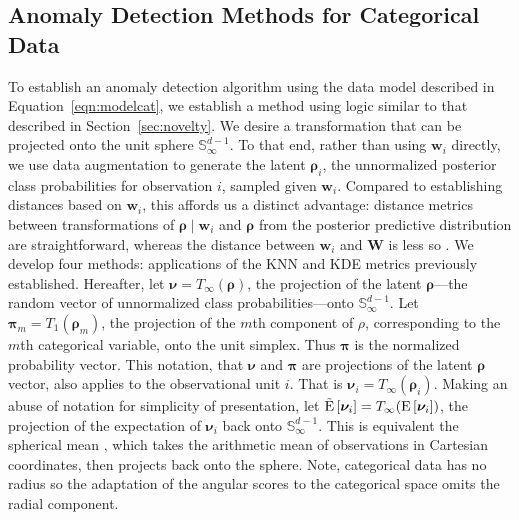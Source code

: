 \subsection{Anomaly Detection Methods for Categorical Data\label{subsec:catscores}}
To establish an anomaly detection algorithm using the data model described in 
  Equation~\ref{eqn:modelcat}, we establish a method using logic similar to that
  described in Section~\ref{sec:novelty}.  We desire a transformation that can be
  projected onto the unit sphere $\mathbb{S}_{\infty}^{d-1}$.  To that end, rather
  than using $\bm{w}_i$ directly, we use data augmentation to generate the latent 
  $\bm{\rho}_i$, the unnormalized posterior class probabilities for observation $i$, 
  sampled given $\bm{w}_i$.  Compared to establishing distances based on $\bm{w}_i$, 
  this affords us a distinct advantage: distance metrics between transformations of
  $\bm{\rho}\mid\bm{w}_i$ and $\bm{\rho}$ from the posterior predictive 
  distribution are straightforward, whereas the distance between $\bm{w}_i$ and $\bm{W}$ 
  is less so \cite{Alamuri2014}. We develop four methods: applications of the KNN and 
  KDE metrics previously established.  Hereafter, let $\bm{\nu} = T_{\infty}\left(\bm{\rho}\right)$, 
  the projection of the latent $\bm{\rho}$---the random vector of unnormalized class 
  probabilities---onto $\mathbb{S}_{\infty}^{d-1}$.  Let $\bm{\pi}_{m} = T_{1}(\bm{\rho}_m)$,
  the projection of the $m$th component of $\rho$, corresponding to the $m$th categorical 
  variable, onto the unit simplex. Thus $\bm{\pi}$ is the normalized probability vector.
  This notation, that $\bm{\nu}$ and $\bm{\pi}$ are projections of the latent $\bm{\rho}$
  vector, also applies
  to the observational unit $i$.  That is $\bm{\nu}_i = T_{\infty}(\bm{\rho}_i)$.
  Making an abuse of notation for simplicity of presentation, 
  let $\tilde{\text{E}}\left[\bm{\nu}_i\right] = T_{\infty}(\text{E}\left[\bm{\nu}_i\right])$, the 
  projection of the expectation of $\bm{\nu}_i$ back onto $\mathbb{S}_{\infty}^{d-1}$.  
  This is equivalent the spherical mean \cite{mardia1999}, which takes the arithmetic 
  mean of observations in Cartesian coordinates, then projects back onto the sphere.
  Note, categorical data has no radius so the adaptation of the angular scores to
  the categorical space omits the radial component.

